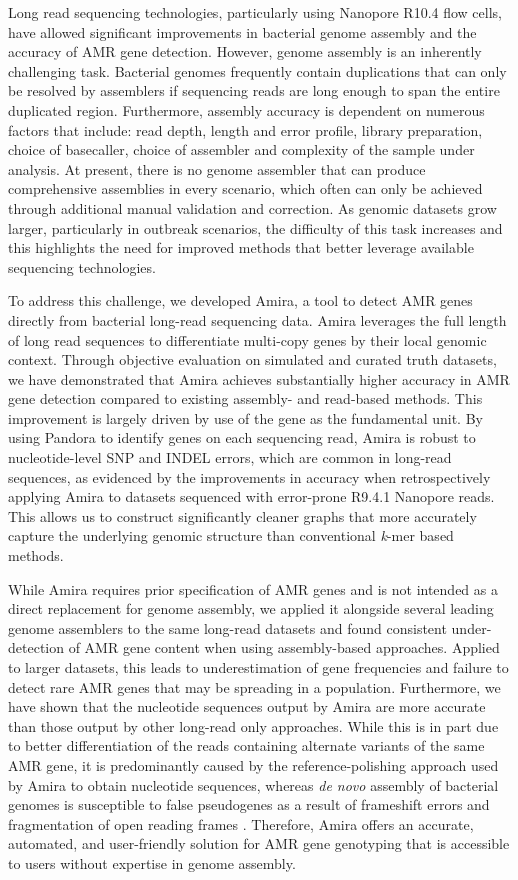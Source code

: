 Long read sequencing technologies, particularly using Nanopore R10.4 flow cells, have allowed significant improvements in bacterial genome assembly and the accuracy of AMR gene detection. However, genome assembly is an inherently challenging task. Bacterial genomes frequently contain duplications that can only be resolved by assemblers if sequencing reads are long enough to span the entire duplicated region. Furthermore, assembly accuracy is dependent on numerous factors that include: read depth, length and error profile, library preparation, choice of basecaller, choice of assembler and complexity of the sample under analysis. At present, there is no genome assembler that can produce comprehensive assemblies in every scenario, which often can only be achieved through additional manual validation and correction. As genomic datasets grow larger, particularly in outbreak scenarios, the difficulty of this task increases and this highlights the need for improved methods that better leverage available sequencing technologies.

To address this challenge, we developed Amira, a tool to detect AMR genes directly from bacterial long-read sequencing data. Amira leverages the full length of long read sequences to differentiate multi-copy genes by their local genomic context. Through objective evaluation on simulated and curated truth datasets, we have demonstrated that Amira achieves substantially higher accuracy in AMR gene detection compared to existing assembly- and read-based methods. This improvement is largely driven by use of the gene as the fundamental unit. By using Pandora to identify genes on each sequencing read, Amira is robust to nucleotide-level SNP and INDEL errors, which are common in long-read sequences, as evidenced by the improvements in accuracy when retrospectively applying Amira to datasets sequenced with error-prone R9.4.1 Nanopore reads. This allows us to construct significantly cleaner graphs that more accurately capture the underlying genomic structure than conventional \textit{k}-mer based methods. 

While Amira requires prior specification of AMR genes and is not intended as a direct replacement for genome assembly, we applied it alongside several leading genome assemblers to the same long-read datasets and found consistent under-detection of AMR gene content when using assembly-based approaches. Applied to larger datasets, this leads to underestimation of gene frequencies and failure to detect rare AMR genes that may be spreading in a population. Furthermore, we have shown that the nucleotide sequences output by Amira are more accurate than those output by other long-read only approaches. While this is in part due to better differentiation of the reads containing alternate variants of the same AMR gene, it is predominantly caused by the reference-polishing approach used by Amira to obtain nucleotide sequences, whereas \textit{de novo} assembly of bacterial genomes is susceptible to false pseudogenes as a result of frameshift errors and fragmentation of open reading frames \cite{Cooley2024}. Therefore, Amira offers an accurate, automated, and user-friendly solution for AMR gene genotyping that is accessible to users without expertise in genome assembly. 

